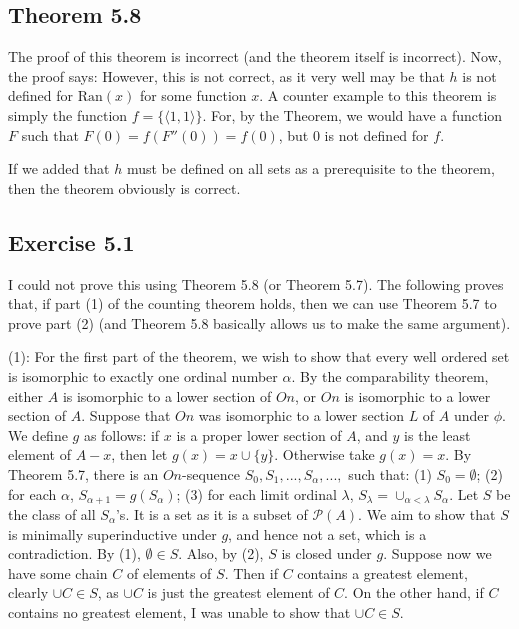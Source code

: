 \documentclass{article}
\theoremstyle{definition}
\begin{document}
\subsection*{Theorem 5.8}
The proof of this theorem is incorrect (and the theorem itself is incorrect). Now, the proof says: However, this is not correct, as it very well may be that $h$ is not defined for $\textrm{Ran}(x)$ for some function 
$x$. A counter example to this theorem is simply the function $f=\{\langle 1,1\rangle\}$. For, by the Theorem, we would have a function $F$ such that
$F(0)=f(F''(0))=f(0)$, but 0 is not defined for $f$.

If we added that $h$ must be defined on all sets as a prerequisite to the theorem, then the theorem obviously is correct.

\subsection*{Exercise 5.1}
I could not prove this using Theorem 5.8 (or Theorem 5.7). The following proves that, if part (1) of the counting theorem holds, then we can use 
Theorem 5.7 to prove part (2) (and Theorem 5.8 basically allows us to make the same argument).

(1): For the first part of the theorem, we wish to show that every well ordered set is isomorphic to exactly one ordinal number $\alpha$. By the 
comparability theorem, either $A$ is isomorphic to a lower section of $On$, or $On$ is isomorphic to a lower section of $A$. Suppose that 
$On$ was isomorphic to a lower section $L$ of $A$ under $\phi$. We define $g$ as 
follows: if $x$ is a proper lower section of $A$, and $y$ is the least element of $A-x$, then let $g(x)=x\cup\{y\}$. Otherwise take $g(x)=x$. 
By Theorem 5.7,
there is an $On$-sequence $S_0,S_1,...,S_\alpha,...,$ such that:\newline
(1) $S_0=\emptyset$;\newline
(2) for each $\alpha$, $S_{\alpha+1}=g(S_\alpha)$;\newline
(3) for each limit ordinal $\lambda$, $S_\lambda=\cup_{\alpha<\lambda}S_\alpha$.\newline
Let $S$ be the class of all $S_\alpha$'s. It is a set as it is a subset of $\mathcal{P}(A)$. We aim to show that $S$ is minimally 
superinductive under $g$, and hence not a set, which is a contradiction. By (1), $\emptyset\in S$. Also, by (2), 
$S$ is closed under $g$. Suppose now we have some chain $C$ of elements of $S$. Then if $C$ contains a greatest element, clearly 
$\cup C\in S$, as $\cup C$ is just the greatest element of $C$. On the other hand, if $C$ contains no greatest element, I was unable to 
show that $\cup C\in S$.
\end{document}
